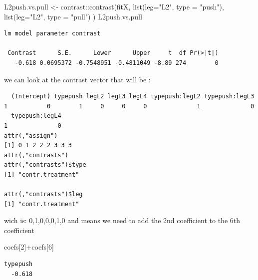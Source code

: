 \documentclass[
  letterpaper,
  DIV=11,
  numbers=noendperiod]{scrartcl}
\newenvironment{Shaded}{\begin{snugshade}}{\end{snugshade}}
\newcommand{\AttributeTok}[1]{\textcolor[rgb]{0.40,0.45,0.13}{#1}}
\newcommand{\DecValTok}[1]{\textcolor[rgb]{0.68,0.00,0.00}{#1}}
\newcommand{\FunctionTok}[1]{\textcolor[rgb]{0.28,0.35,0.67}{#1}}
\newcommand{\NormalTok}[1]{\textcolor[rgb]{0.00,0.23,0.31}{#1}}
\newcommand{\OtherTok}[1]{\textcolor[rgb]{0.00,0.23,0.31}{#1}}
\newcommand{\SpecialCharTok}[1]{\textcolor[rgb]{0.37,0.37,0.37}{#1}}
\newcommand{\StringTok}[1]{\textcolor[rgb]{0.13,0.47,0.30}{#1}}
\begin{document}
\begin{Shaded}
\begin{Highlighting}[]
\NormalTok{L2push.vs.pull }\OtherTok{\textless{}{-}}\NormalTok{ contrast}\SpecialCharTok{::}\FunctionTok{contrast}\NormalTok{(fitX,}
  \FunctionTok{list}\NormalTok{(}\AttributeTok{leg=}\StringTok{"L2"}\NormalTok{, }\AttributeTok{type =} \StringTok{"push"}\NormalTok{),}
  \FunctionTok{list}\NormalTok{(}\AttributeTok{leg=}\StringTok{"L2"}\NormalTok{, }\AttributeTok{type =} \StringTok{"pull"}\NormalTok{)}
\NormalTok{)}
\NormalTok{L2push.vs.pull}
\end{Highlighting}
\end{Shaded}

\begin{verbatim}
lm model parameter contrast

 Contrast      S.E.      Lower      Upper     t  df Pr(>|t|)
   -0.618 0.0695372 -0.7548951 -0.4811049 -8.89 274        0
\end{verbatim}

we can look at the contrast vector that will be :

\begin{Shaded}
\end{Shaded}

\begin{verbatim}
  (Intercept) typepush legL2 legL3 legL4 typepush:legL2 typepush:legL3
1           0        1     0     0     0              1              0
  typepush:legL4
1              0
attr(,"assign")
[1] 0 1 2 2 2 3 3 3
attr(,"contrasts")
attr(,"contrasts")$type
[1] "contr.treatment"

attr(,"contrasts")$leg
[1] "contr.treatment"
\end{verbatim}

wich is: 0,1,0,0,0,1,0 and means we need to add the 2nd coefficient to
the 6th coefficient

\begin{Shaded}
\begin{Highlighting}[]
\NormalTok{coefs[}\DecValTok{2}\NormalTok{]}\SpecialCharTok{+}\NormalTok{coefs[}\DecValTok{6}\NormalTok{]}
\end{Highlighting}
\end{Shaded}

\begin{verbatim}
typepush 
  -0.618 
\end{verbatim}
\end{document}
